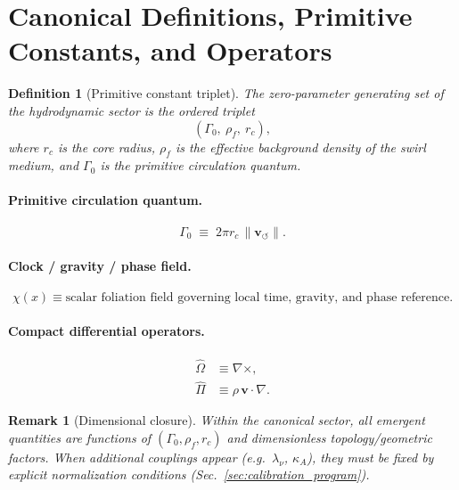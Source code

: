 \documentclass[10pt]{article}
\newtheorem{definition}{Definition}[section]
\newtheorem{remark}{Remark}[section]
\begin{document}
    \section*{Canonical Definitions, Primitive Constants, and Operators}

\begin{definition}[Primitive constant triplet]
The \emph{zero-parameter generating set} of the hydrodynamic sector is the ordered triplet
\begin{equation}
(\Gamma_0,\ \rho_{\!f},\ r_c),
\end{equation}
where $r_c$ is the core radius, $\rho_{\!f}$ is the effective background density of the swirl medium,
and $\Gamma_0$ is the primitive circulation quantum.
\end{definition}

\paragraph{Primitive circulation quantum.}
\begin{equation}
\Gamma_0 \;\equiv\; 2\pi r_c\,\lVert \mathbf{v}_{\!\boldsymbol{\circlearrowleft}}\rVert.
\end{equation}

\paragraph{Clock / gravity / phase field.}
\begin{equation}
\chi(x)\equiv \text{scalar foliation field governing local time, gravity, and phase reference}.
\end{equation}

\paragraph{Compact differential operators.}
\begin{align}
\hat{\Omega} &\equiv \nabla\times,\\
\hat{\Pi} &\equiv \rho\,\mathbf{v}\cdot\nabla.
\end{align}

\begin{remark}[Dimensional closure]
Within the canonical sector, all emergent quantities are functions of
$(\Gamma_0,\rho_{\!f},r_c)$ and dimensionless topology/geometric factors.
When additional couplings appear (e.g.\ $\lambda_\nu$, $\kappa_A$), they must be fixed
by explicit normalization conditions (Sec.~\ref{sec:calibration_program}).
\end{remark}
\end{document}
